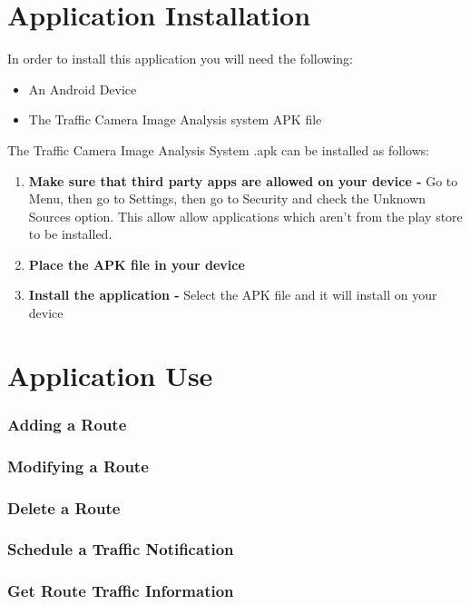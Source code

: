 \documentclass[a4paper,12pt]{article}
\begin{document}
\section{Application Installation}
In order to install this application you will need the following:
\begin{itemize}
\item An Android Device
\item The Traffic Camera Image Analysis system APK file
\end{itemize}

The Traffic Camera Image Analysis System .apk can be installed as follows:
\begin{enumerate}
\item \textbf{Make sure that third party apps are allowed on your device -} Go to Menu, then go to Settings, then go to Security and check the Unknown Sources option. This allow allow applications which aren't from the play store to be installed.
\item \textbf{Place the APK file in your device} 
\item \textbf{Install the application -} Select the APK file and it will install on your device
\end{enumerate}

\section{Application Use}
\subsubsection{Adding a Route}
\subsubsection{Modifying a Route}
\subsubsection{Delete a Route}
\subsubsection{Schedule a Traffic Notification}
\subsubsection{Get Route Traffic Information}
\end{document}
